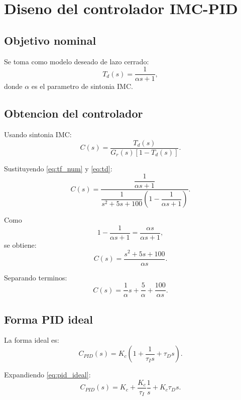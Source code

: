 \documentclass[11pt]{article}
\begin{document}
\section{Diseno del controlador IMC-PID}

\subsection{Objetivo nominal}

Se toma como modelo deseado de lazo cerrado:
\begin{equation}
T_d(s)=\frac{1}{\alpha s+1},
\label{eq:td}
\end{equation}
donde $\alpha$ es el parametro de sintonia IMC.

\subsection{Obtencion del controlador}

Usando sintonia IMC:
\begin{equation}
C(s)=\frac{T_d(s)}{G_r(s)\left[1-T_d(s)\right]}.
\end{equation}

Sustituyendo \eqref{eq:tf_num} y \eqref{eq:td}:
\begin{equation}
C(s)=
\frac{\dfrac{1}{\alpha s+1}}
{\dfrac{1}{s^2+5s+100}\left(1-\dfrac{1}{\alpha s+1}\right)}.
\end{equation}

Como
\[
1-\frac{1}{\alpha s+1}=\frac{\alpha s}{\alpha s+1},
\]
se obtiene:
\begin{equation}
C(s)=\frac{s^2+5s+100}{\alpha s}.
\label{eq:c_alpha}
\end{equation}

Separando terminos:
\begin{equation}
C(s)=\frac{1}{\alpha}s+\frac{5}{\alpha}+\frac{100}{\alpha s}.
\label{eq:c_parallel}
\end{equation}

\subsection{Forma PID ideal}

La forma ideal es:
\begin{equation}
C_{PID}(s)=K_c\left(1+\frac{1}{\tau_I s}+\tau_D s\right).
\label{eq:pid_ideal}
\end{equation}

Expandiendo \eqref{eq:pid_ideal}:
\begin{equation}
C_{PID}(s)=K_c+\frac{K_c}{\tau_I}\frac{1}{s}+K_c\tau_D s.
\label{eq:pid_ideal_exp}
\end{equation}
\end{document}
